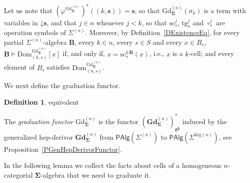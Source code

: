 \documentclass[a4paper, reqno]{amsbook}
\makeatletter
\newcommand{\vs}[1]{\mathbin{\downarrow}#1}
\newcommand{\sig}[1]{\mathbf{#1}}             %
\newcommand{\Dom}{\mathrm{Dom}}
\newcommand{\gd}{\mathfrak{gd}}              %
\newcommand{\htg}{\mathrm{htg}}                %
\newcommand{\src}{\mathrm{sc}}
\newcommand{\tgt}{\mathrm{tg}}
\newcommand{\Gd}{\mathrm{Gd}}
\newcommand{\bGd}{\mathbf{Gd}}
\theoremstyle{plain}
\theoremstyle{definition}
\newtheorem{definition}[theorem]{Definition}
\newcommand*{\CA@leanpending}{}
\newcommand*{\CA@leanrelation}{}
\newcommand*{\lean}[2]{%
  \ifcsname\string\color@lean@#1\endcsname\else
    \PackageError{main}{Unknown relation `#1' in \string\lean}{Use equivalent, weaker or stronger.}%
  \fi
  \gdef\CA@leanrelation{#1}%
  \gdef\CA@leanpending{#2}}
\makeatother
\begin{document}
Let us note that $(\varphi^{\Gd^{(n)}_{\sig{\Sigma}}})^{\star}((k,\mathbf{s}))=\mathbf{s}$, so that $\Gd^{(n)}_{\sig{\Sigma}}(\sigma_{k})$ is a term with variables in $\vs{\mathbf{s}}$, and that $j\in n$ whenever $j<k$, so that $\src^{j}_{s}$, $\tgt^{j}_{s}$ and $\circ^{j}_{s}$ are operation symbols of $\Sigma^{(n)}$.
Moreover, by Definition~\ref{DExistenceEq}, for every partial $\Sigma^{(n)}$-algebra $\mathbf{B}$, every $k\in n$, every $s\in S$ and every $x\in B_{s}$, $\mathbf{B}\models\Dom^{\Gd^{(n)}_{\sig{\Sigma}}}_{(k,s)}[x]$ if, and only if, $x=\src^{k\,\mathbf{B}}_{s}(x)$, i.e., $x$ is a $k$-cell; and every element of $B_{s}$ satisfies $\Dom^{\Gd^{(n)}_{\sig{\Sigma}}}_{(n,s)}$.

We next define the graduation functor.

\begin{definition}\label{DGdFunctor}\lean{equivalent}{Presentations.graduationPartialFunctor}
The \emph{graduation functor} $\Gd^{(n)}_{\sig{\Sigma}}$ is the functor $(\bGd^{(n)}_{\sig{\Sigma}})^{\ast}_{\gd}$ induced by the generalized hep-derivor $\bGd^{(n)}_{\sig{\Sigma}}$ from $\mathsf{PAlg}(\Sigma^{(n)})$ to $\mathsf{PAlg}(\Sigma^{\htg(n)})$, see Proposition~\ref{PGenHepDerivorFunctor}.
\end{definition}

In the following lemma we collect the facts about cells of a homogeneous $n$-categorial $\sig{\Sigma}$-algebra that we need to graduate it.
\end{document}
